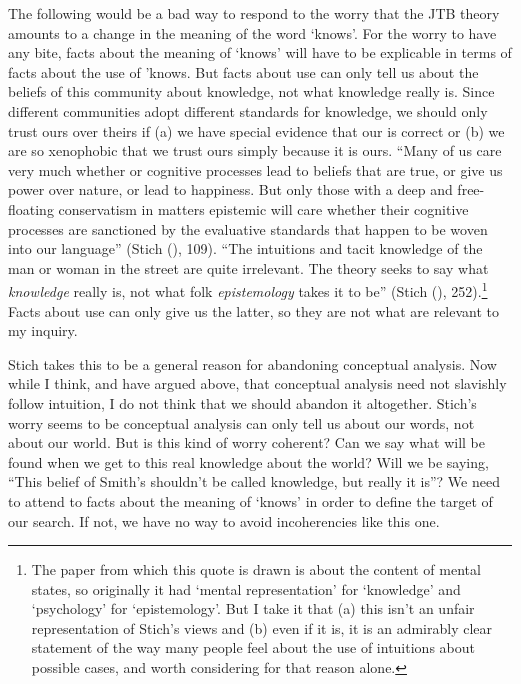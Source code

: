 \documentclass[
  10pt,
  letterpaper,
  DIV=11,
  numbers=noendperiod,
  twoside]{scrartcl}
\begin{document}
The following would be a bad way to respond to the worry that the JTB
theory amounts to a change in the meaning of the word `knows'. For the
worry to have any bite, facts about the meaning of `knows' will have to
be explicable in terms of facts about the use of 'knows. But facts about
use can only tell us about the beliefs of this community about
knowledge, not what knowledge really is. Since different communities
adopt different standards for knowledge, we should only trust ours over
theirs if (a) we have special evidence that our is correct or (b) we are
so xenophobic that we trust ours simply because it is ours. ``Many of us
care very much whether or cognitive processes lead to beliefs that are
true, or give us power over nature, or lead to happiness. But only those
with a deep and free-floating conservatism in matters epistemic will
care whether their cognitive processes are sanctioned by the evaluative
standards that happen to be woven into our language'' (Stich
(), 109). ``The intuitions and tacit
knowledge of the man or woman in the street are quite irrelevant. The
theory seeks to say what \emph{knowledge} really is, not what folk
\emph{epistemology} takes it to be'' (Stich
(), 252).\footnote{The paper from which
  this quote is drawn is about the content of mental states, so
  originally it had `mental representation' for `knowledge' and
  `psychology' for `epistemology'. But I take it that (a) this isn't an
  unfair representation of Stich's views and (b) even if it is, it is an
  admirably clear statement of the way many people feel about the use of
  intuitions about possible cases, and worth considering for that reason
  alone.} Facts about use can only give us the latter, so they are not
what are relevant to my inquiry.

Stich takes this to be a general reason for abandoning conceptual
analysis. Now while I think, and have argued above, that conceptual
analysis need not slavishly follow intuition, I do not think that we
should abandon it altogether. Stich's worry seems to be conceptual
analysis can only tell us about our words, not about our world. But is
this kind of worry coherent? Can we say what will be found when we get
to this real knowledge about the world? Will we be saying, ``This belief
of Smith's shouldn't be called knowledge, but really it is''? We need to
attend to facts about the meaning of `knows' in order to define the
target of our search. If not, we have no way to avoid incoherencies like
this one.
\end{document}
